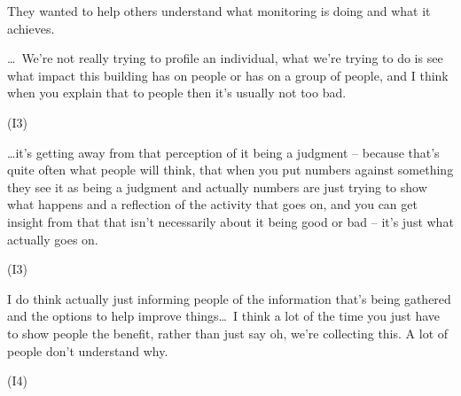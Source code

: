 They wanted to help others understand what monitoring is doing and
what it achieves.

\begin{qt} \ldots\  We’re not really
trying to profile an individual, what we’re trying to do is see what
impact this building has on people or has on a group of people, and I
think when you explain that to people then it’s usually not too bad.\end{qt}
(I3)

\begin{qt}\ldots it’s getting away from that perception of it being a judgment –
because that’s quite often what people will think, that when you put
numbers against something they see it as being a judgment and actually
numbers are just trying to show what happens and a reflection of the
activity that goes on, and you can get insight from that that isn’t
necessarily about it being good or bad – it’s just what actually goes
on.\end{qt} (I3)

\begin{qt}I do think actually just informing people of the information that’s
being gathered and the options to help improve things\ldots\  I think a lot
of the time you just have to show people the benefit, rather than just
say oh, we’re collecting this. A lot of people don’t understand why.\end{qt}
(I4)
